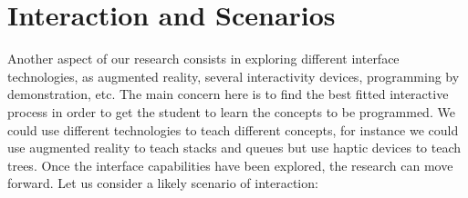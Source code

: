 
\section{Interaction and Scenarios}

Another aspect of our research consists in exploring different
interface technologies, as augmented reality, several interactivity
devices, programming by demonstration, etc. The main concern here is
to find the best fitted interactive process in order to get the
student to learn the concepts to be programmed. We could use different
technologies to teach different concepts, for instance we could use
augmented reality to teach stacks and queues but use haptic devices to
teach trees. Once the interface capabilities have been explored, the
research can move forward. Let us consider a likely scenario of
interaction:
